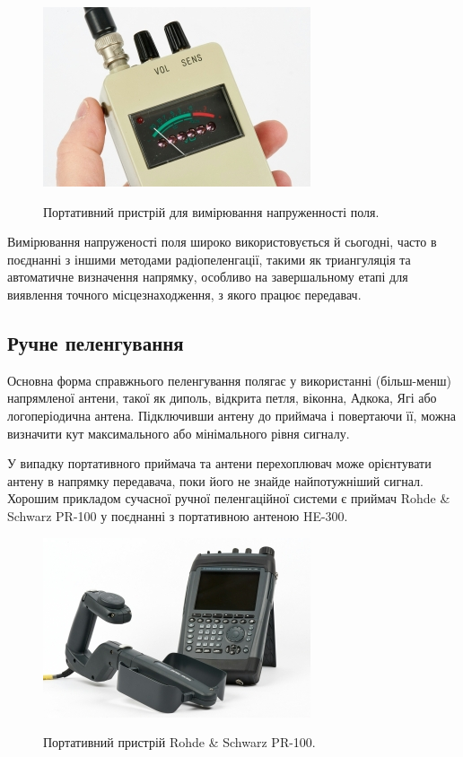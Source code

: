\documentclass{article}
\begin{document}
\begin{figure}[H]
\centering
{\includegraphics[width=0.6\linewidth]{images/rdf-small.jpg}}
\caption{\label{fig:rds:small}Портативний пристрій для вимірювання напруженності поля.}
\end{figure}

Вимірювання напруженості поля широко використовується й сьогодні, часто в поєднанні з іншими методами радіопеленгації, такими як триангуляція та автоматичне визначення напрямку, особливо на завершальному етапі для виявлення точного місцезнаходження, з якого працює передавач.
 
\subsection{Ручне пеленгування}
Основна форма справжнього пеленгування полягає у використанні (більш-менш) напрямленої антени, такої як диполь, відкрита петля, віконна, Адкока, Ягі або логоперіодична антена. Підключивши антену до приймача і повертаючи її, можна визначити кут максимального або мінімального рівня сигналу.

У випадку портативного приймача та антени перехоплювач може орієнтувати антену в напрямку передавача, поки його не знайде найпотужніший сигнал. Хорошим прикладом сучасної ручної пеленгаційної системи є приймач Rohde \& Schwarz PR-100 у поєднанні з портативною антеною HE-300. 

\begin{figure}[H]
\centering
{\includegraphics[width=0.6\linewidth]{images/rds-rs-100.jpg}}
\caption{\label{fig:rds:pr100}Портативний пристрій Rohde \& Schwarz PR-100.}
\end{figure}
\end{document}
